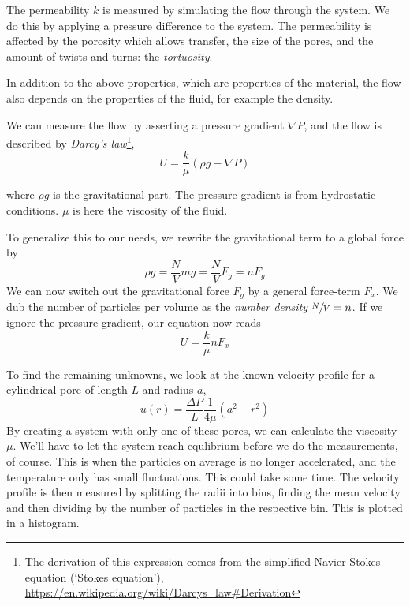 \documentclass[11pt]{article}
\numberwithin{equation}{section}
\numberwithin{figure}{section}
\newcommand{\ita}[1]{\textit{#1}}
\begin{document}
The permeability $k$ is measured by simulating the flow through the
system. We do this by applying a pressure difference to the system.
The permeability is affected by the porosity which allows transfer,
the size of the pores, and the amount of twists and turns:
the \ita{tortuosity}.

In addition to the above properties, which are properties of
the material, the flow also depends on the properties of the
fluid, for example the density.

We can measure the flow by asserting a pressure gradient $\nabla P$,
and the flow is described by \ita{Darcy's law}\footnote{The 
    derivation of this expression comes from the simplified
    Navier-Stokes equation (`Stokes equation'),
    \url{https://en.wikipedia.org/wiki/Darcys\_law\#Derivation}},
\begin{equation}
    U = \frac{k}{\mu}(\rho g - \nabla P)
\end{equation}

where $\rho g$ is the gravitational part. The pressure gradient
is from hydrostatic conditions. $\mu$ is here the viscosity
of the fluid. 

To generalize this to our needs, we
rewrite the gravitational term to a global force by
\begin{equation}
    \rho g = \frac{N}{V} mg = \frac{N}{V} F_g = n F_g
\end{equation}
We can now switch out the gravitational force $F_g$ by
a general force-term $F_x$. We dub the number of particles
per volume as the \ita{number density} $\sfrac{N}{V} = n$.
If we ignore the pressure gradient, our equation now reads
\begin{equation}
    U = \frac{k}{\mu}n F_x
\end{equation}

To find the remaining unknowns, we look at the known velocity profile
for a cylindrical pore of length $L$ and radius $a$,
\begin{equation}
    u(r) = \frac{\Delta P}{L} \frac{1}{4\mu}(a^2 - r^2)
\end{equation}
By creating a system with only one of these pores, we can 
calculate the viscosity $\mu$. We'll have to let the system reach
equlibrium before we do the measurements, of course.
This is when the particles on average is no longer accelerated,
and the temperature only has small fluctuations. This
could take some time. The velocity profile is then
measured by splitting the radii into bins, finding the mean
velocity and then dividing by the number of particles in the respective bin.
This is plotted in a histogram.
\end{document}

